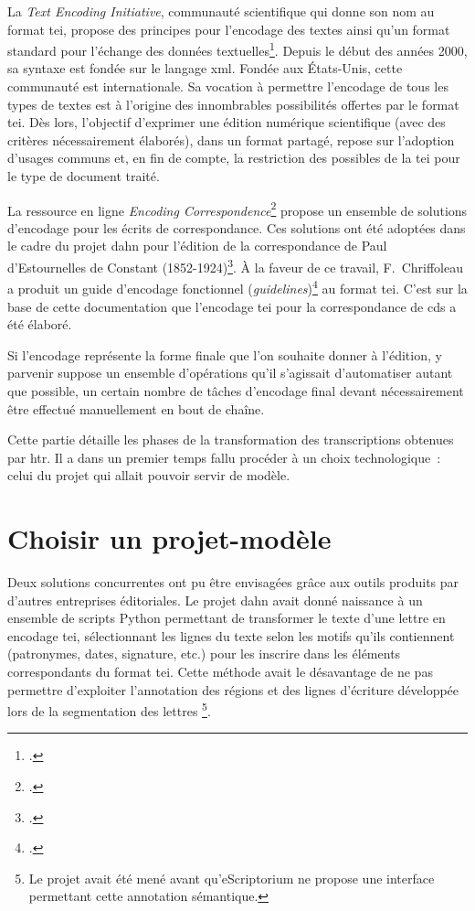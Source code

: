 \documentclass[a4paper,12pt,twoside]{book}
\begin{document}
		La \textit{Text Encoding Initiative}, communauté scientifique qui donne son nom au format \gls{tei}, propose des principes pour l'encodage des textes ainsi qu'un format standard pour l'échange des données textuelles\footcite{TEITextEncoding}. Depuis le début des années 2000, sa syntaxe est fondée sur le langage \gls{xml}. Fondée aux États-Unis, cette communauté est internationale. Sa vocation à permettre l'encodage de tous les types de textes est à l'origine des innombrables possibilités offertes par le format \gls{tei}. Dès lors, l'objectif d'exprimer une édition numérique scientifique (avec des critères nécessairement élaborés), dans un format partagé, repose sur l'adoption d'usages communs et, en fin de compte, la restriction des possibles de la \gls{tei} pour le type de document traité. 
		
		La ressource en ligne \textit{Encoding Correspondence}\footcite{dumontEncodingCorrespondenceManual2019} propose un ensemble de solutions d'encodage pour les écrits de correspondance. Ces solutions ont été adoptées dans le cadre du projet \gls{dahn} pour l'édition de la correspondance de Paul d’Estournelles de Constant (1852-1924)\footcite{chiffoleauEncodingXMLTree2020}. À la faveur de ce travail, F.~Chriffoleau a produit un guide d'encodage fonctionnel (\textit{guidelines})\footcite{chiffoleauCorrespondenceGuidelines2022} au format \gls{tei}. C'est sur la base de cette documentation que l'encodage \gls{tei} pour la correspondance de \gls{cds} a été élaboré.
		
		Si l'encodage représente la forme finale que l'on souhaite donner à l'édition, y parvenir suppose un ensemble d'opérations qu'il s'agissait d'automatiser autant que possible, un certain nombre de tâches d'encodage final devant nécessairement être effectué manuellement en bout de chaîne.
		
		Cette partie détaille les phases de la transformation des transcriptions obtenues par \gls{htr}. Il a dans un premier temps fallu procéder à un choix technologique~: celui du projet qui allait pouvoir servir de modèle.
		
		\section{Choisir un projet-modèle}
			
			Deux solutions concurrentes ont pu être envisagées grâce aux outils produits par d'autres entreprises éditoriales. Le projet \gls{dahn} avait donné naissance à un ensemble de scripts Python permettant de transformer le texte d'une lettre en encodage \gls{tei}, sélectionnant les lignes du texte selon les motifs qu'ils contiennent (patronymes, dates, signature, etc.) pour les inscrire dans les éléments correspondants du format \gls{tei}. Cette méthode avait le désavantage de ne pas permettre d'exploiter l'annotation des régions et des lignes d'écriture développée lors de la segmentation des lettres
			\footnote{Le projet avait été mené avant qu'eScriptorium ne propose une interface permettant cette annotation sémantique.}.
			
\end{document}
